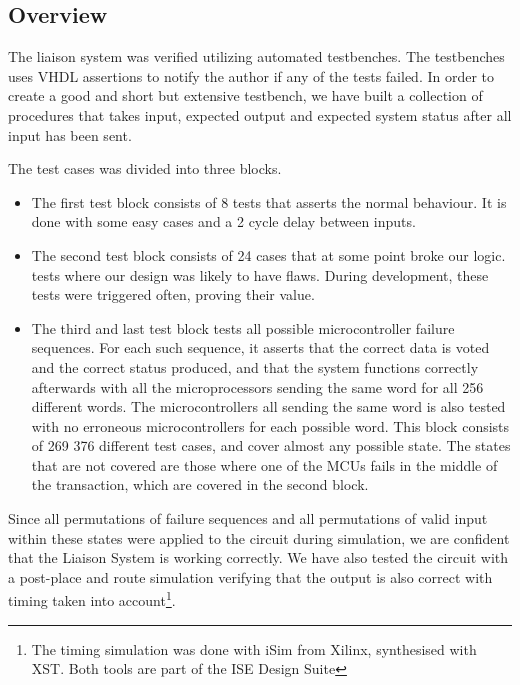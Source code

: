 \subsection{Overview}
The liaison system was verified utilizing automated testbenches. The testbenches uses VHDL assertions to notify the author if any
of the tests failed. In order to create a good and short but extensive testbench, we have built a collection of procedures that takes input, expected output
and expected system status after all input has been sent.

The test cases was divided into three blocks.
\begin{itemize}
\item The first test block consists of 8 tests that asserts the normal behaviour. It is done with some easy cases and a 2 cycle delay between inputs.

\item The second test block consists of 24 cases that at some point broke our logic.  tests where our design was likely to have flaws. During development, these tests were
triggered often, proving their value.

\item The third and last test block tests all possible microcontroller
  failure sequences. For each such sequence, it asserts that the
  correct data is voted and the correct status produced, and that the
  system functions correctly afterwards with all the microprocessors
  sending the same word for all 256 different words. The
  microcontrollers all sending the same word is also tested with no
  erroneous microcontrollers for each possible word. This block
  consists of 269 376 different test cases, and cover almost any
  possible state. The states that are not covered are those where one
  of the MCUs fails in the middle of the transaction, which are
  covered in the second block.
\end{itemize}

Since all permutations of failure sequences and all permutations of
valid input within these states were applied to the circuit during
simulation, we are confident that the Liaison System is working
correctly. We have also tested the circuit with a post-place and route
simulation verifying that the output is also correct with timing taken
into account\footnote{The timing simulation was done with iSim from
  Xilinx, synthesised with XST. Both tools are part of the ISE Design
  Suite}.

